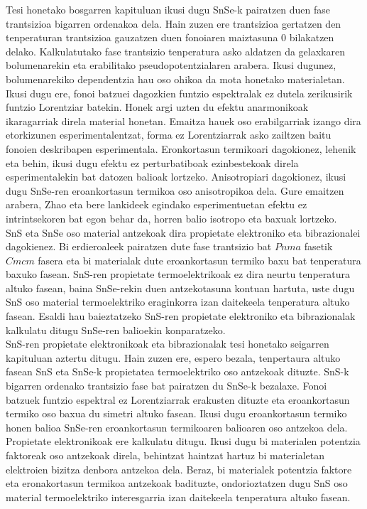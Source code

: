 Tesi honetako bosgarren kapituluan ikusi dugu SnSe-k pairatzen duen fase trantsizioa bigarren ordenakoa dela. Hain 
zuzen ere trantsizioa gertatzen den tenperaturan trantsizioa gauzatzen duen fonoiaren maiztasuna 0 bilakatzen delako. 
Kalkulatutako fase trantsizio tenperatura asko aldatzen da gelaxkaren bolumenarekin eta erabilitako 
pseudopotentzialaren arabera. Ikusi dugunez, bolumenarekiko dependentzia hau oso ohikoa da mota honetako 
materialetan. Ikusi dugu ere, fonoi batzuei dagozkien funtzio espektralak ez dutela zerikusirik funtzio Lorentziar 
batekin. Honek argi uzten du efektu anarmonikoak ikaragarriak direla material honetan. Emaitza hauek oso 
erabilgarriak izango dira etorkizunen esperimentalentzat, forma ez Lorentziarrak asko zailtzen baitu fonoien 
deskribapen esperimentala. Eronkortasun termikoari dagokionez, lehenik eta behin, ikusi dugu efektu ez 
perturbatiboak ezinbestekoak direla esperimentalekin bat datozen balioak lortzeko. Anisotropiari dagokionez, ikusi 
dugu SnSe-ren eroankortasun termikoa oso anisotropikoa dela. Gure emaitzen arabera, Zhao eta bere lankideek egindako 
esperimentuetan efektu ez intrintsekoren bat egon behar da, horren balio isotropo eta baxuak lortzeko. \\

SnS eta SnSe oso material antzekoak dira propietate elektroniko eta bibrazionalei dagokienez. Bi erdieroaleek 
pairatzen dute fase trantsizio bat $Pnma$ fasetik $Cmcm$ fasera eta bi materialak dute eroankortasun termiko baxu 
bat tenperatura baxuko fasean. SnS-ren propietate termoelektrikoak ez dira neurtu tenperatura altuko fasean, baina 
SnSe-rekin duen antzekotasuna kontuan hartuta, uste dugu SnS oso material termoelektriko eraginkorra izan daitekeela 
tenperatura altuko fasean. Esaldi hau baieztatzeko SnS-ren propietate elektroniko eta bibrazionalak kalkulatu ditugu 
SnSe-ren balioekin konparatzeko. \\

SnS-ren propietate elektronikoak eta bibrazionalak tesi honetako seigarren kapituluan aztertu ditugu.
Hain zuzen ere, espero bezala, tenpertaura altuko fasean SnS eta SnSe-k propietatea termoelektriko oso antzekoak 
dituzte. SnS-k bigarren ordenako trantsizio fase bat pairatzen du SnSe-k bezalaxe. Fonoi batzuek funtzio espektral 
ez Lorentziarrak erakusten dituzte eta eroankortasun termiko oso baxua du simetri altuko fasean. Ikusi dugu 
eroankortasun termiko honen balioa SnSe-ren eroankortasun termikoaren balioaren oso antzekoa dela. Propietate 
elektronikoak ere kalkulatu ditugu. Ikusi dugu bi materialen potentzia faktoreak oso antzekoak direla, behintzat
haintzat hartuz bi materialetan elektroien bizitza denbora antzekoa dela. Beraz, bi materialek potentzia faktore 
eta eronakortasun termikoa antzekoak badituzte, ondorioztatzen dugu SnS oso material termoelektriko interesgarria 
izan daitekeela tenperatura altuko fasean. \\

